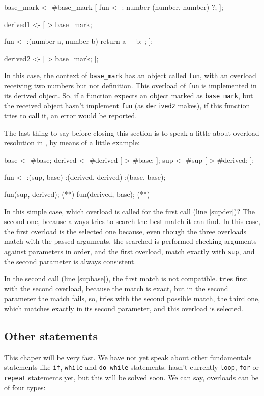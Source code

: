 \documentclass{article}
\begin{document}
\begin{faupp2}
  base_mark <-
     #base_mark [
        fun <- : number (number, number) ?;
     ];

  derived1 <-
     [
         > base_mark;

         fun <- :(number a, number b)
                { return a + b; };
     ];

  derived2 <- [ > base_mark; ];
\end{faupp2}

In this case, the context of \texttt{base\_mark} has an object called
\texttt{fun}, with an overload receiving two numbers but not definition. This
overload of \texttt{fun} is implemented in its derived object. So, if a function
expects an object marked as \texttt{base\_mark}, but the received object hasn't
implement \texttt{fun} (as \texttt{derived2} makes), if this function tries to
call it, an error would be reported.

The last thing to say before closing this section is to speak a little about
overload resolution in \faupp, by means of a little example:

\begin{faupp2}
   base <- #base;
   derived <- #derived [ > #base; ];
   sup <- #sup [ > #derived; ];

   fun <- :(sup, base) {}
          :(derived, derived) {}
          :(base, base);

   fun(sup, derived); (*\label{supder}*)
   fun(derived, base); (*\label{supbase}*)
\end{faupp2}

In this simple case, which overload is called for the first call (line
\ref{supder})? The second one, because \faupp always tries to search the best
match it can find. In this case, the first overload is the selected one because,
even though the three overloads match with the passed arguments, the searched is
performed checking arguments against parameters in order, and the first
overload, match exactly with \texttt{sup}, and the second parameter is always
consistent.

In the second call (line \ref{supbase}), the first match is not
compatible. \ffaupp tries first with the second overload, because the match is
exact, but in the second parameter the match fails, so, \faupp tries with the
second possible match, the third one, which matches exactly in its second
parameter, and this overload is selected.

\subsection{Other statements}
This chaper will be very fast. We have not yet speak about other fundamentals
statements like \texttt{if}, \texttt{while} and \texttt{do while}
statements. \ffaupp hasn't currently \texttt{loop}, \texttt{for} or
\texttt{repeat} statements yet, but this will be solved soon. We can say,
overloads can be of four types:
\end{document}
